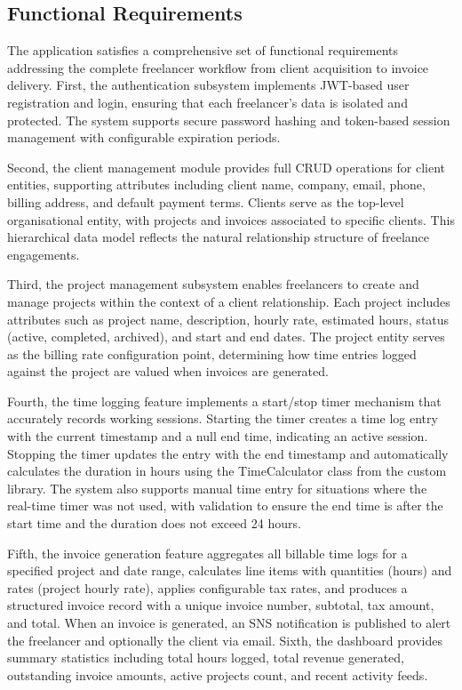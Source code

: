 \documentclass[conference]{IEEEtran}
\begin{document}
\subsection{Functional Requirements}

The application satisfies a comprehensive set of functional requirements addressing the complete freelancer workflow from client acquisition to invoice delivery. First, the authentication subsystem implements JWT-based user registration and login, ensuring that each freelancer's data is isolated and protected. The system supports secure password hashing and token-based session management with configurable expiration periods.

Second, the client management module provides full CRUD operations for client entities, supporting attributes including client name, company, email, phone, billing address, and default payment terms. Clients serve as the top-level organisational entity, with projects and invoices associated to specific clients. This hierarchical data model reflects the natural relationship structure of freelance engagements.

Third, the project management subsystem enables freelancers to create and manage projects within the context of a client relationship. Each project includes attributes such as project name, description, hourly rate, estimated hours, status (active, completed, archived), and start and end dates. The project entity serves as the billing rate configuration point, determining how time entries logged against the project are valued when invoices are generated.

Fourth, the time logging feature implements a start/stop timer mechanism that accurately records working sessions. Starting the timer creates a time log entry with the current timestamp and a null end time, indicating an active session. Stopping the timer updates the entry with the end timestamp and automatically calculates the duration in hours using the TimeCalculator class from the custom library. The system also supports manual time entry for situations where the real-time timer was not used, with validation to ensure the end time is after the start time and the duration does not exceed 24 hours.

Fifth, the invoice generation feature aggregates all billable time logs for a specified project and date range, calculates line items with quantities (hours) and rates (project hourly rate), applies configurable tax rates, and produces a structured invoice record with a unique invoice number, subtotal, tax amount, and total. When an invoice is generated, an SNS notification is published to alert the freelancer and optionally the client via email. Sixth, the dashboard provides summary statistics including total hours logged, total revenue generated, outstanding invoice amounts, active projects count, and recent activity feeds.
\end{document}
